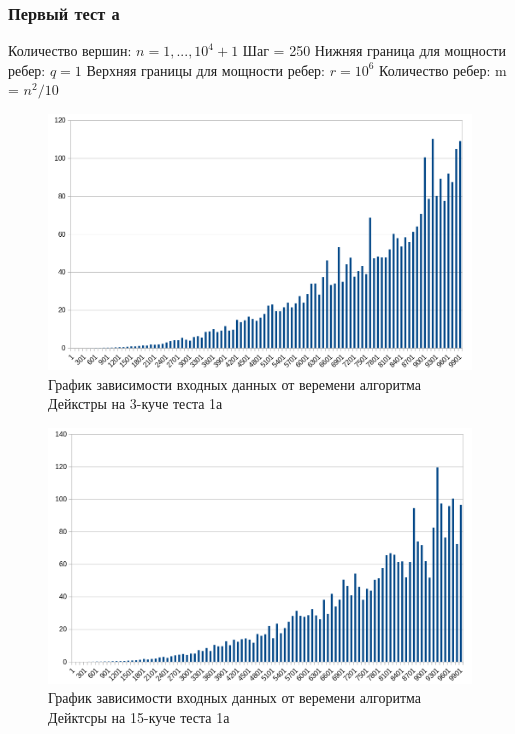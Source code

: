\documentclass[a4paper, 12pt]{article}
\theoremstyle{definition}
\begin{document}
	\subsubsection{Первый тест а}
	Количество вершин: $n = 1, ... , 10^4+1$ \newline
	Шаг = 250 \newline
	Нижняя граница для мощности ребер: $q = 1$ \newline
	Верхняя границы для мощности ребер: $r = 10^6$ \newline
	Количество ребер: m = $n^2/10$ \newline
	\begin{figure}[!ht]
		\centering
		\includegraphics[width=1\textwidth]{img/res1a_3.png}
		\caption{График зависимости входных данных от веремени алгоритма Дейкстры на 3-куче теста 1а}
		\label{fig:my_image}
	\end{figure}
	
	\begin{figure}[!ht]
		\centering
		\includegraphics[width=1\textwidth]{img/res1a_15.png}
		\caption{График зависимости входных данных от веремени алгоритма Дейктсры на 15-куче теста 1а}
		\label{fig:my_image}
	\end{figure}
	\newpage
	
\end{document}
